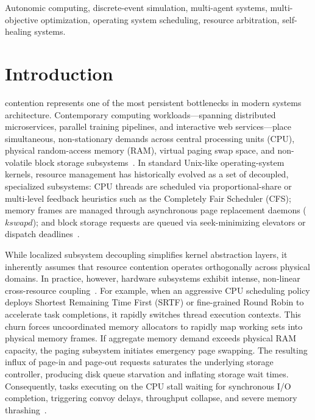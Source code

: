\documentclass[conference]{IEEEtran}
\begin{document}
\begin{abstract}
(Jain's index of $0.3934$), demonstrating that overhead compliance does not guarantee universal guardrail satisfaction and revealing survivorship bias in unpenalized conventional baselines.
\end{abstract}

\begin{IEEEkeywords}
Autonomic computing, discrete-event simulation, multi-agent systems, multi-objective optimization, operating system scheduling, resource arbitration, self-healing systems.
\end{IEEEkeywords}

\section{Introduction}
 contention represents one of the most persistent bottlenecks in modern systems architecture. Contemporary computing workloads—spanning distributed microservices, parallel training pipelines, and interactive web services—place simultaneous, non-stationary demands across central processing units (CPU), physical random-access memory (RAM), virtual paging swap space, and non-volatile block storage subsystems~\cite{silberschatz2018operating, tanenbaum2015modern}. In standard Unix-like operating-system kernels, resource management has historically evolved as a set of decoupled, specialized subsystems: CPU threads are scheduled via proportional-share or multi-level feedback heuristics such as the Completely Fair Scheduler (CFS); memory frames are managed through asynchronous page replacement daemons ($kswapd$); and block storage requests are queued via seek-minimizing elevators or dispatch deadlines~\cite{arpacidusseau2018operating, waldspurger1994lottery}.

While localized subsystem decoupling simplifies kernel abstraction layers, it inherently assumes that resource contention operates orthogonally across physical domains. In practice, however, hardware subsystems exhibit intense, non-linear cross-resource coupling~\cite{delimitrou2013paragon, lo2015heracles, mars2011bubble}. For example, when an aggressive CPU scheduling policy deploys Shortest Remaining Time First (SRTF) or fine-grained Round Robin to accelerate task completions, it rapidly switches thread execution contexts. This churn forces uncoordinated memory allocators to rapidly map working sets into physical memory frames. If aggregate memory demand exceeds physical RAM capacity, the paging subsystem initiates emergency page swapping. The resulting influx of page-in and page-out requests saturates the underlying storage controller, producing disk queue starvation and inflating storage wait times. Consequently, tasks executing on the CPU stall waiting for synchronous I/O completion, triggering convoy delays, throughput collapse, and severe memory thrashing~\cite{tang2011compiling, kasture2014ubik}.
\end{document}
